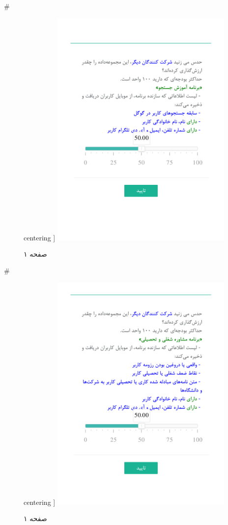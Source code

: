 { 
 # 
\begin{figure}[htpb]
centering ]
\includegraphics[width=0.8\textwidth]{./img/Task58.png/}
\caption{صفحه ۱}
\label{fig:Task1}
\end{figure}
 
 
 # 
\begin{figure}[htpb]
centering ]
\includegraphics[width=0.8\textwidth]{./img/Task59.png/}
\caption{صفحه ۱}
\label{fig:Task1}
\end{figure}
 
}
